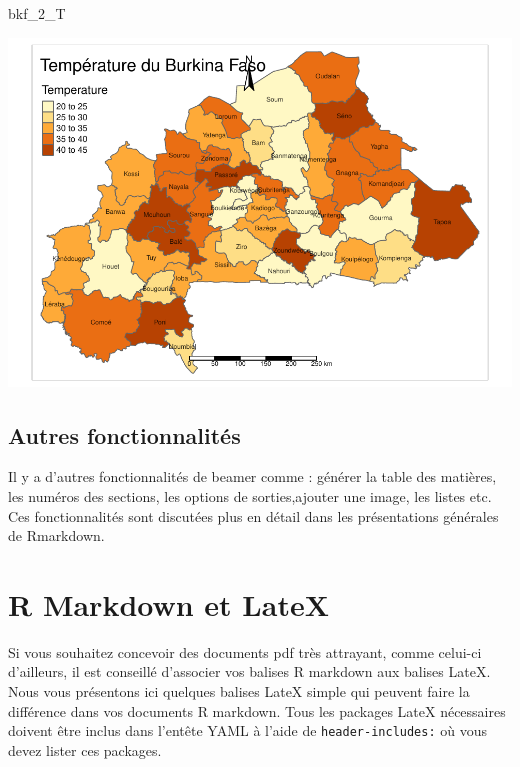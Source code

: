 \documentclass[
  12pt,
]{article}
\newenvironment{Shaded}{\begin{snugshade}}{\end{snugshade}}
\newcommand{\NormalTok}[1]{#1}
\begin{document}
\begin{Shaded}
\begin{Highlighting}[]
\NormalTok{bkf\_2\_T}
\end{Highlighting}
\end{Shaded}

\includegraphics{Document_RMD_GRP5_files/figure-latex/plot-1.pdf}

\subsection{Autres fonctionnalités}\label{autres-fonctionnalituxe9s}

Il y a d'autres fonctionnalités de beamer comme : générer la table des
matières, les numéros des sections, les options de sorties,ajouter une
image, les listes etc. Ces fonctionnalités sont discutées plus en détail
dans les présentations générales de Rmarkdown.

\newpage

\section{R Markdown et LateX}\label{r-markdown-et-latex}

Si vous souhaitez concevoir des documents pdf très attrayant, comme
celui-ci d'ailleurs, il est conseillé d'associer vos balises R markdown
aux balises LateX. Nous vous présentons ici quelques balises LateX
simple qui peuvent faire la différence dans vos documents R markdown.
Tous les packages LateX nécessaires doivent être inclus dans l'entête
YAML à l'aide de \texttt{header-includes:} où vous devez lister ces
packages.
\end{document}
